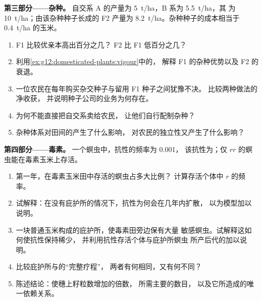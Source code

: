 \begin{problem}
\medskip
\noindent\textbf{第三部分——杂种。}
自交系 A 的产量为 \qty{5}{t/ha}，B 系为 \qty{5.5}{t/ha}，其 为 \qty{10}{t/ha}；由该杂种种子长成的 F2 产量为
\qty{8.2}{t/ha}。杂种种子的成本相当于 \qty{0.4}{t/ha}
的玉米。
\begin{enumerate}[resume]
  \item F1 比较优亲本高出百分之几？
        F2 比 F1 低百分之几？
  \item 利用\cref{ex:g12:domesticated-plants:vigour}中的，
        解释 F1 的杂种优势以及 F2 的衰退。
  \item 一位农民在每年购买杂交种子与留用 F1 种子之间犹豫不决。
        比较两种做法的净收获，
        并说明种子公司的业务为何存在。
  \item 为何不能直接把自交系卖给农民，
        让他们自行配制杂种？
  \item 杂种体系对田间的产生了什么影响，
        对农民的独立性又产生了什么影响？
\end{enumerate}

\medskip
\noindent\textbf{第四部分——毒素。}
一个螟虫中，抗性的频率为 0.001，
该抗性为；仅 $rr$ 的螟虫能在毒素玉米上存活。
\begin{enumerate}[resume]
  \item 第一年，在毒素玉米田中存活的螟虫占多大比例？
        计算存活个体中
        $r$ 的频率。
  \item 试解释：在没有庇护所的情况下，抗性为何会在几年内扩散，
        以为模型加以说明。
  \item 一块普通玉米构成的庇护所，使毒素田旁边保有大量
        敏感螟虫。试解释这如何使抗性保持稀少，
        并利用抗性存活个体与庇护所螟虫
        所产后代的加以说明。
  \item 比较庇护所与的“完整疗程”，
        两者有何相同，又有何不同？
  \item 陈述结论：使穗上籽粒数增加的倍数，
        所需主要的数目，
        以及它所造成的唯一依赖关系。
\end{enumerate}
\end{problem}
